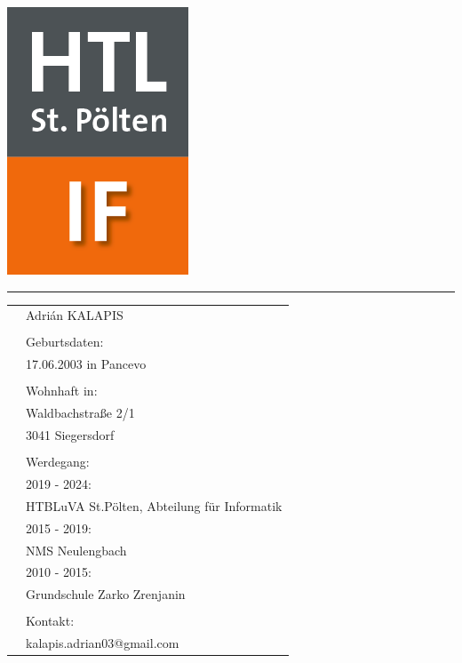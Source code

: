 \begin{flushleft}
    \hspace{3cm} \includegraphics[scale=0.3]{images/HTL_IF.png} 
    
    \vspace{-0.9cm}
    \hspace{6cm}
    \textcolor{green}{\rule{8cm}{5pt}}
\end{flushleft}

\begin{tabular}{p{3cm}l}
    & Adrián KALAPIS \\
    \\
    & Geburtsdaten: \\
    &17.06.2003 in Pancevo \\
    \\
    &Wohnhaft in: \\
    &Waldbachstraße 2/1 \\
    &3041 Siegersdorf \\
    \\
    &Werdegang:\\
    &2019 - 2024: \\
    &HTBLuVA St.Pölten, Abteilung für Informatik \\
    &2015 - 2019: \\
    &NMS Neulengbach\\
    &2010 - 2015: \\
    &Grundschule Zarko Zrenjanin \\
    \\
    &Kontakt: \\
    &kalapis.adrian03@gmail.com \\
\end{tabular}
